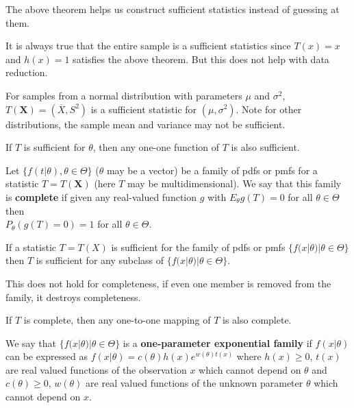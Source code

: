\begin{note}
    The above theorem helps us construct sufficient statistics instead of guessing at them.
\end{note}

\begin{note}
    It is always true that the entire sample is a sufficient statistics since $T(x)=x$ and $h(x) = 1$ satisfies the above theorem. But this does not help with data reduction.
\end{note}

\begin{note}
    For samples from a normal distribution with parameters $\mu$ and $\sigma^2$, $T(\bm{X}) = (\overline{X}, S^2)$ is a sufficient statistic for $(\mu, \sigma^2)$.
Note for other distributions, the sample mean and variance may not be sufficient.
\end{note}

\begin{note}
    If $T$ is sufficient for $\theta$, then any one-one function of $T$ is also sufficient.
\end{note}

\begin{defn}
    Let $\{ f(t|\theta), \theta \in \Theta \}$ ($\theta$ may be a vector) be a family of pdfs or pmfs for a statistic $T = T(\bm{X})$ (here $T$ may be multidimensional). We say that this family is \textbf{complete} if given any real-valued function $g$ with $E_\theta g(T) = 0$ for all $\theta \in \Theta$ then \\$P_\theta(g(T) = 0) = 1$ for all $\theta \in \Theta$.
\end{defn}

\begin{note}
    If a statistic $T = T(X)$ is sufficient for the family of pdfs or pmfs $\{ f(x|\theta) | \theta \in \Theta \}$ then $T$ is sufficient for any subclass of $\{ f(x|\theta) | \theta \in \Theta \}$. 

    This does not hold for completeness, if even one member is removed from the family, it destroys completeness.
\end{note}

\begin{thm}
    If $T$ is complete, then any one-to-one mapping of $T$ is also complete.
\end{thm}

\begin{defn}
    We say that $\{ f(x|\theta) | \theta \in \Theta \}$ is a \textbf{one-parameter exponential family} if $f(x|\theta)$ can be expressed as $f(x|\theta) = c(\theta) h(x) e^{w(\theta) t(x)}$ where $h(x) \geq 0$, $t(x)$ are real valued functions of the observation $x$ which cannot depend on $\theta$ and $c(\theta) \geq 0$, $w(\theta)$ are real valued functions of the unknown parameter $\theta$ which cannot depend on $x$. 
\end{defn}

